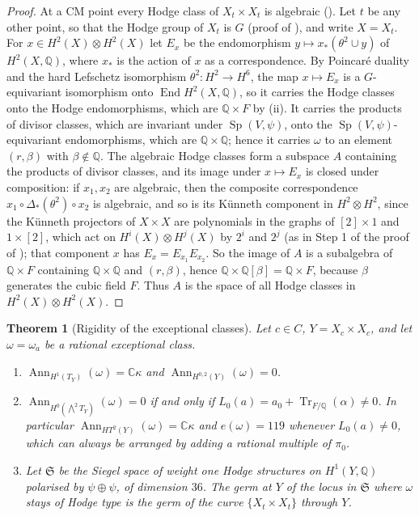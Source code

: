 \documentclass[11pt,reqno]{amsart}
\theoremstyle{plain}
\newtheorem{theorem}{Theorem}[section]
\theoremstyle{definition}
\theoremstyle{remark}
\newcommand{\QQ}{\mathbb{Q}}
\newcommand{\CC}{\mathbb{C}}
\DeclareMathOperator{\End}{End}
\DeclareMathOperator{\Tr}{Tr}
\DeclareMathOperator{\Sp}{Sp}
\DeclareMathOperator{\Ann}{Ann}
\begin{document}
\begin{proof}
At a CM point every Hodge class of $X_{t}\times X_{t}$ is algebraic
(). Let $t$ be any other point, so that the Hodge group
of $X_{t}$ is $G$ (proof of ), and write $X=X_{t}$.
For $x\in H^{2}(X)\otimes H^{2}(X)$ let $E_{x}$ be the endomorphism $y\mapsto x_{*}(\theta^{2}\cup y)$ of $H^{2}(X,\QQ)$, where
$x_{*}$ is the action of $x$ as a correspondence. By Poincar\'e duality and
the hard Lefschetz isomorphism $\theta^{2}\colon H^{2}\to H^{6}$, the map
$x\mapsto E_{x}$ is a $G$-equivariant isomorphism onto $\End H^{2}(X,\QQ)$,
so it carries the Hodge classes onto the Hodge endomorphisms, which are
$\QQ\times F$ by (ii). It carries the products of
divisor classes, which are invariant under $\Sp(V,\psi)$, onto the
$\Sp(V,\psi)$-equivariant endomorphisms, which are $\QQ\times\QQ$; hence it
carries $\omega$ to an element $(r,\beta)$ with $\beta\notin\QQ$. The
algebraic Hodge classes form a subspace $A$ containing the products of divisor
classes, and its image under $x\mapsto E_{x}$ is closed under composition:
if $x_{1},x_{2}$ are algebraic, then the composite correspondence $x_{1}\circ\Delta_{*}(\theta^{2})\circ
x_{2}$ is algebraic, and so is its K\"unneth component in
$H^{2}\otimes H^{2}$, since the K\"unneth projectors of $X\times X$ are
polynomials in the graphs of $[2]\times1$ and $1\times[2]$, which act on
$H^{i}(X)\otimes H^{j}(X)$ by $2^{i}$ and $2^{j}$ (as in Step 1 of the proof
of ); that component $x$ has
$E_{x}=E_{x_{1}}E_{x_{2}}$. So the image of $A$ is a subalgebra of
$\QQ\times F$ containing $\QQ\times\QQ$ and $(r,\beta)$, hence
$\QQ\times\QQ[\beta]=\QQ\times F$, because $\beta$ generates the cubic
field $F$. Thus $A$ is the space of all Hodge classes in
$H^{2}(X)\otimes H^{2}(X)$.
\end{proof}

\begin{theorem}[Rigidity of the exceptional classes]\label{thm:mumfordrigid}
Let $c\in C$, $Y=X_{c}\times X_{c}$, and let $\omega=\omega_{a}$ be a
rational exceptional class.
\begin{enumerate}[label=\textup{(\roman*)},leftmargin=2.6em,itemsep=2pt]
\item $\Ann_{H^{1}(T_{Y})}(\omega)=\CC\kappa$ and
  $\Ann_{H^{0,2}(Y)}(\omega)=0$.
\item $\Ann_{H^{0}(\bigwedge^{2}T_{Y})}(\omega)=0$ if and only if
  $L_{0}(a)=a_{0}+\Tr_{F/\QQ}(\alpha)\ne0$. In particular
  $\Ann_{HT^{2}(Y)}(\omega)=\CC\kappa$ and $e(\omega)=119$ whenever
  $L_{0}(a)\ne0$, which can always be arranged by adding a rational multiple
  of $\pi_{0}$.
\item Let $\mathfrak{S}$ be the Siegel space of weight one Hodge structures on
  $H^{1}(Y,\QQ)$ polarised by $\psi\oplus\psi$, of dimension $36$. The germ at
  $Y$ of the locus in $\mathfrak{S}$ where $\omega$ stays of Hodge type is the
  germ of the curve $\{X_{t}\times X_{t}\}$ through $Y$.
\end{enumerate}
\end{theorem}
\end{document}
